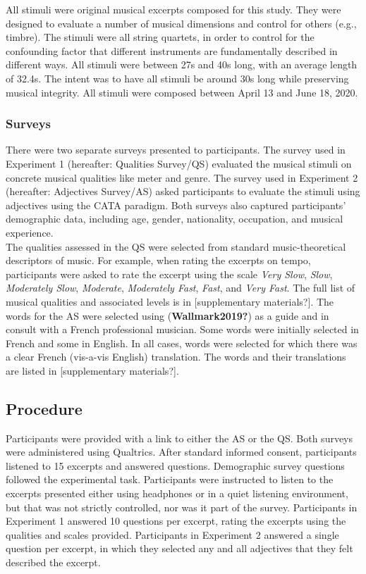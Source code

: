 \documentclass[
  english,
  man,floatsintext]{apa6}
\begin{document}
All stimuli were original musical excerpts composed for this study. They were designed to evaluate a number of musical dimensions and control for others (e.g., timbre). The stimuli were all string quartets, in order to control for the confounding factor that different instruments are fundamentally described in different ways. All stimuli were between 27s and 40s long, with an average length of 32.4s. The intent was to have all stimuli be around 30s long while preserving musical integrity. All stimuli were composed between April 13 and June 18, 2020.

\hypertarget{surveys}{%
\subsubsection{Surveys}\label{surveys}}

There were two separate surveys presented to participants. The survey used in Experiment 1 (hereafter: Qualities Survey/QS) evaluated the musical stimuli on concrete musical qualities like meter and genre. The survey used in Experiment 2 (hereafter: Adjectives Survey/AS) asked participants to evaluate the stimuli using adjectives using the CATA paradigm. Both surveys also captured participants' demographic data, including age, gender, nationality, occupation, and musical experience.\\
The qualities assessed in the QS were selected from standard music-theoretical descriptors of music. For example, when rating the excerpts on tempo, participants were asked to rate the excerpt using the scale \emph{Very Slow}, \emph{Slow}, \emph{Moderately Slow}, \emph{Moderate}, \emph{Moderately Fast}, \emph{Fast}, and \emph{Very Fast}. The full list of musical qualities and associated levels is in {[}supplementary materials?{]}. The words for the AS were selected using (\textbf{Wallmark2019?}) as a guide and in consult with a French professional musician. Some words were initially selected in French and some in English. In all cases, words were selected for which there was a clear French (vis-a-vis English) translation. The words and their translations are listed in {[}supplementary materials?{]}.

\hypertarget{procedure}{%
\subsection{Procedure}\label{procedure}}

Participants were provided with a link to either the AS or the QS. Both surveys were administered using Qualtrics. After standard informed consent, participants listened to 15 excerpts and answered questions. Demographic survey questions followed the experimental task. Participants were instructed to listen to the excerpts presented either using headphones or in a quiet listening environment, but that was not strictly controlled, nor was it part of the survey. Participants in Experiment 1 answered 10 questions per excerpt, rating the excerpts using the qualities and scales provided. Participants in Experiment 2 answered a single question per excerpt, in which they selected any and all adjectives that they felt described the excerpt.
\end{document}
